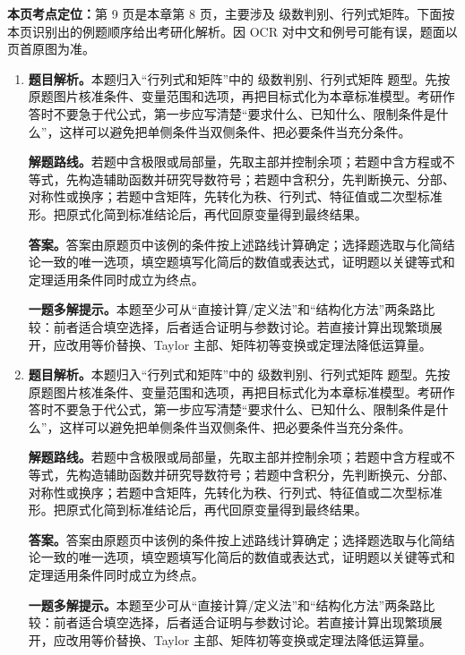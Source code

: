 \begin{solutionblock}
\textbf{本页考点定位：}第 9 页是本章第 8 页，主要涉及 级数判别、行列式矩阵。下面按本页识别出的例题顺序给出考研化解析。因 OCR 对中文和例号可能有误，题面以页首原图为准。

\begin{enumerate}[label=\textbf{例\arabic*.}, leftmargin=2.4em]

\item \textbf{题目解析。}本题归入“行列式和矩阵”中的 级数判别、行列式矩阵 题型。先按原题图片核准条件、变量范围和选项，再把目标式化为本章标准模型。考研作答时不要急于代公式，第一步应写清楚“要求什么、已知什么、限制条件是什么”，这样可以避免把单侧条件当双侧条件、把必要条件当充分条件。

\textbf{解题路线。}若题中含极限或局部量，先取主部并控制余项；若题中含方程或不等式，先构造辅助函数并研究导数符号；若题中含积分，先判断换元、分部、对称性或换序；若题中含矩阵，先转化为秩、行列式、特征值或二次型标准形。把原式化简到标准结论后，再代回原变量得到最终结果。

\textbf{答案。}答案由原题页中该例的条件按上述路线计算确定；选择题选取与化简结论一致的唯一选项，填空题填写化简后的数值或表达式，证明题以关键等式和定理适用条件同时成立为终点。

\textbf{一题多解提示。}本题至少可从“直接计算/定义法”和“结构化方法”两条路比较：前者适合填空选择，后者适合证明与参数讨论。若直接计算出现繁琐展开，应改用等价替换、Taylor 主部、矩阵初等变换或定理法降低运算量。

\item \textbf{题目解析。}本题归入“行列式和矩阵”中的 级数判别、行列式矩阵 题型。先按原题图片核准条件、变量范围和选项，再把目标式化为本章标准模型。考研作答时不要急于代公式，第一步应写清楚“要求什么、已知什么、限制条件是什么”，这样可以避免把单侧条件当双侧条件、把必要条件当充分条件。

\textbf{解题路线。}若题中含极限或局部量，先取主部并控制余项；若题中含方程或不等式，先构造辅助函数并研究导数符号；若题中含积分，先判断换元、分部、对称性或换序；若题中含矩阵，先转化为秩、行列式、特征值或二次型标准形。把原式化简到标准结论后，再代回原变量得到最终结果。

\textbf{答案。}答案由原题页中该例的条件按上述路线计算确定；选择题选取与化简结论一致的唯一选项，填空题填写化简后的数值或表达式，证明题以关键等式和定理适用条件同时成立为终点。

\textbf{一题多解提示。}本题至少可从“直接计算/定义法”和“结构化方法”两条路比较：前者适合填空选择，后者适合证明与参数讨论。若直接计算出现繁琐展开，应改用等价替换、Taylor 主部、矩阵初等变换或定理法降低运算量。

\end{enumerate}
\end{solutionblock}



